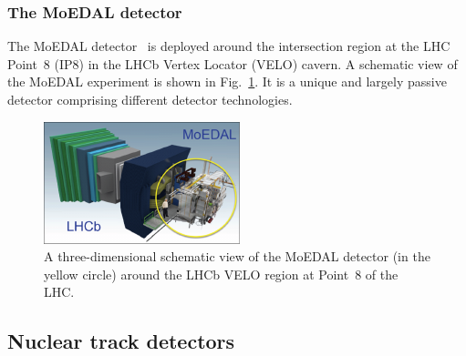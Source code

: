 \subsubsection{The MoEDAL detector}\label{sc:detector}

The MoEDAL detector~\cite{moedal} is deployed around the intersection region at the LHC Point~8 (IP8) in the LHCb Vertex Locator (VELO) cavern. A schematic view of the MoEDAL experiment is shown in Fig.~\ref{fg:moedal-lhcb}. It is a unique and largely passive detector comprising different detector technologies. 
\begin{figure}[htb]
\begin{minipage}[b]{0.55\textwidth}
\includegraphics[width=\textwidth]{plots/moedal-detector}
\end{minipage}\hspace{0.05\textwidth}%
\begin{minipage}[b]{0.4\textwidth}
\caption{\label{fg:moedal-lhcb} A three-dimensional schematic view of the MoEDAL detector (in the yellow circle) around the LHCb VELO region at Point~8 of the LHC.}
\end{minipage} 
\end{figure}

\subsection{Nuclear track detectors}\label{sc:ndt}

